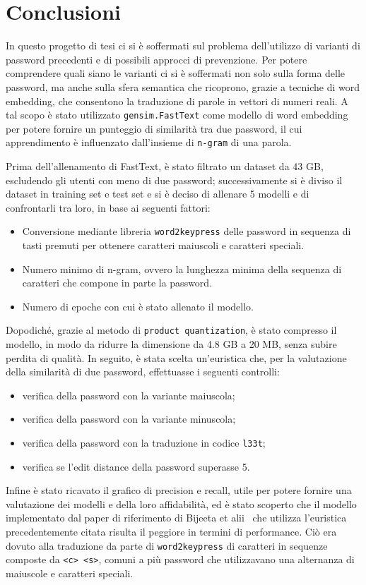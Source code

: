 \chapter*{Conclusioni}
In questo progetto di tesi ci si è soffermati sul problema dell'utilizzo di varianti di password precedenti e di possibili approcci di prevenzione. Per potere comprendere quali siano le varianti ci si è soffermati non solo sulla forma delle password, ma anche sulla sfera semantica che ricoprono, grazie a tecniche di word embedding, che consentono la traduzione di parole in vettori di numeri reali. A tal scopo è stato utilizzato \texttt{gensim.FastText} come modello di word embedding per potere fornire un punteggio di similarità tra due password, il cui apprendimento è influenzato dall'insieme di \texttt{n-gram} di una parola.

Prima dell'allenamento di FastText, è stato filtrato un dataset da 43 GB, escludendo gli utenti con meno di due password; successivamente si è diviso il dataset in training set e test set e si è deciso di allenare 5 modelli e di confrontarli tra loro, in base ai seguenti fattori:
\begin{itemize}
    \item Conversione mediante libreria \texttt{word2keypress} delle password in sequenza di tasti premuti per ottenere caratteri maiuscoli e caratteri speciali.
    \item Numero minimo di n-gram, ovvero la lunghezza minima della sequenza di caratteri che compone in parte la password.
    \item Numero di epoche con cui è stato allenato il modello.
\end{itemize}
Dopodiché, grazie al metodo di \texttt{product quantization}, è stato compresso il modello, in modo da ridurre la dimensione da 4.8 GB a 20 MB, senza subire perdita di qualità. In seguito, è stata scelta un'euristica che, per la valutazione della similarità di due password, effettuasse i seguenti controlli:
\begin{itemize}
    \item verifica della password con la variante maiuscola;
    \item verifica della password con la variante minuscola;
    \item verifica della password con la traduzione in codice \texttt{l33t};
    \item verifica se l'edit distance della password superasse 5.
\end{itemize}
Infine è stato ricavato il grafico di precision e recall, utile per potere fornire una valutazione dei modelli e della loro affidabilità, ed è stato scoperto che il modello implementato dal paper di riferimento di Bijeeta et alii~\cite{bijeeta} che utilizza l'euristica precedentemente citata risulta il peggiore in termini di performance. Ciò era dovuto alla traduzione da parte di \texttt{word2keypress} di caratteri in sequenze composte da \texttt{<c> <s>}, comuni a più password che utilizzavano una alternanza di maiuscole e caratteri speciali.

